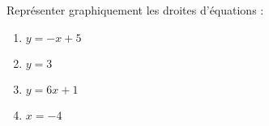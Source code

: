 
\begin{exercice}\label{exosmath-0607}

    Représenter graphiquement les droites d'équations :
    \begin{multicols}{2}
        \begin{enumerate}
            \item
                \( y=-x+5\)
            \item
                \( y=3\)
            \item
                \( y=6x+1\)
            \item
                \( x=-4\)
        \end{enumerate}
    \end{multicols}

\end{exercice}
